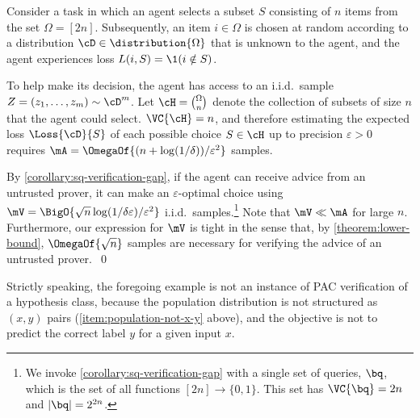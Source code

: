\documentclass{toc}
\begin{document}
\begin{example}
	Consider a task in which an agent selects a subset $S$ consisting of $n$ items from the set $\Omega = [2n]$. Subsequently, an item $i \in \Omega$ is chosen at random according to a distribution $\cD \in \distribution{\Omega}$ that is unknown to the agent, and the agent experiences loss $L(i,S) = \1(i \notin S)$.
	
	To help make its decision, the agent has access to an i.i.d.\ sample $Z = (z_1,\dots,z_m) \sim \cD^m$. Let $\cH = \binom{\Omega}{n}$ denote the collection of subsets of size $n$ that the agent could select. $\VC{\cH} = n$, and therefore estimating the expected loss $\Loss{\cD}{S}$ of each possible choice $S \in \cH$ up to precision $\varepsilon > 0$ requires $\mA = \OmegaOf{(n + \log(1/\delta))/\varepsilon^2}$ samples.
	
	By \cref{corollary:sq-verification-gap}, if the agent can receive advice from an untrusted prover, it can make an $\varepsilon$-optimal choice using $\mV = \BigO{\sqrt{n}\log(1/\delta\varepsilon)/\varepsilon^2}$ i.i.d.\ samples.\footnote{%
		We invoke \cref{corollary:sq-verification-gap} with a single set of queries, $\bq$, which is the set of all functions $[2n] \to \{0,1\}$. This set has $\VC{\bq} = 2n$ and $|\bq| = 2^{2n}$.
	} Note that $\mV \ll \mA$ for large $n$. Furthermore, our expression for $\mV$ is tight in the sense that, by \cref{theorem:lower-bound}, $\OmegaOf{\sqrt{n}}$ samples are necessary for verifying the advice of an untrusted prover.~\qed
\end{example}

Strictly speaking, the foregoing example is not an instance of PAC verification of a hypothesis class, because the population distribution is not structured as $(x,y)$ pairs (\cref{item:population-not-x-y} above), and the objective is not to predict the correct label $y$ for a given input $x$. 
\end{document}
